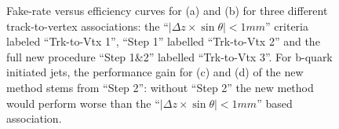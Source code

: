 \begin{figure}[!htbp]
  \centering
  \caption{Fake-rate versus efficiency curves for \cJVF (a) and \RpT (b) for three different track-to-vertex associations: 
  the ``$|\Delta z \times \sin\theta| < 1 \unit{mm}$'' criteria labeled ``Trk-to-Vtx 1'', ``Step 1'' labelled ``Trk-to-Vtx 2'' and the full new procedure ``Step 1\&2'' labelled ``Trk-to-Vtx 3''.
  For b-quark initiated jets, the performance gain for \cJVF (c) and \RpT (d) of the new method stems from ``Step 2'': without ``Step 2'' the new method would perform worse than the
  ``$|\Delta z \times \sin\theta| < 1 \unit{mm}$'' based association.
  }
\label{fig:test}
\end{figure}
